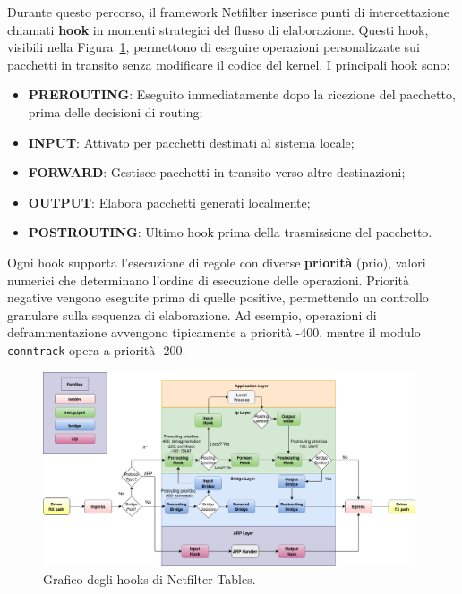 Durante questo percorso, il framework Netfilter inserisce punti di intercettazione chiamati \textbf{hook} in momenti strategici del flusso di elaborazione. Questi hook, visibili nella Figura~\ref{fig:nftables_hooks}, permettono di eseguire operazioni personalizzate sui pacchetti in transito senza modificare il codice del kernel. I principali hook sono:

\begin{itemize}
    \setlength{\itemsep}{1pt}
    \setlength{\parskip}{1pt}
    \item \textbf{PREROUTING}: Eseguito immediatamente dopo la ricezione del pacchetto, prima delle decisioni di routing;
    \item \textbf{INPUT}: Attivato per pacchetti destinati al sistema locale;
    \item \textbf{FORWARD}: Gestisce pacchetti in transito verso altre destinazioni;
    \item \textbf{OUTPUT}: Elabora pacchetti generati localmente;
    \item \textbf{POSTROUTING}: Ultimo hook prima della trasmissione del pacchetto.
\end{itemize}

Ogni hook supporta l'esecuzione di regole con diverse \textbf{priorità} (prio), valori numerici che determinano l'ordine di esecuzione delle operazioni. Priorità negative vengono eseguite prima di quelle positive, permettendo un controllo granulare sulla sequenza di elaborazione. Ad esempio, operazioni di deframmentazione avvengono tipicamente a priorità -400, mentre il modulo \texttt{conntrack} opera a priorità -200.

\begin{figure}[H]
    \centering
    \includegraphics[width=0.98\textwidth]{images/chapter3/nf-hooks.png}
    \caption{Grafico degli hooks di Netfilter Tables.}\label{fig:nftables_hooks}
\end{figure}

